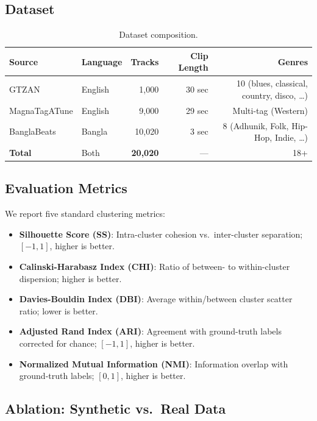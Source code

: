 \documentclass{article}
\begin{document}
\subsection{Dataset}

\begin{table}[H]
\centering
\caption{Dataset composition.}
\label{tab:dataset}
\small
\begin{tabular}{llrrr}
\toprule
\textbf{Source} & \textbf{Language} & \textbf{Tracks} & \textbf{Clip Length} & \textbf{Genres} \\
\midrule
GTZAN & English & 1,000 & 30 sec & 10 (blues, classical, country, disco, \ldots) \\
MagnaTagATune & English & 9,000 & 29 sec & Multi-tag (Western) \\
BanglaBeats & Bangla & 10,020 & 3 sec & 8 (Adhunik, Folk, Hip-Hop, Indie, \ldots) \\
\midrule
\textbf{Total} & Both & \textbf{20,020} & --- & 18+ \\
\bottomrule
\end{tabular}
\end{table}

\subsection{Evaluation Metrics}

We report five standard clustering metrics:
\begin{itemize}
    \item \textbf{Silhouette Score (SS)}: Intra-cluster cohesion vs.\ inter-cluster separation; $[-1, 1]$, higher is better.
    \item \textbf{Calinski-Harabasz Index (CHI)}: Ratio of between- to within-cluster dispersion; higher is better.
    \item \textbf{Davies-Bouldin Index (DBI)}: Average within/between cluster scatter ratio; lower is better.
    \item \textbf{Adjusted Rand Index (ARI)}: Agreement with ground-truth labels corrected for chance; $[-1, 1]$, higher is better.
    \item \textbf{Normalized Mutual Information (NMI)}: Information overlap with ground-truth labels; $[0, 1]$, higher is better.
\end{itemize}

\subsection{Ablation: Synthetic vs.\ Real Data}
\end{document}
